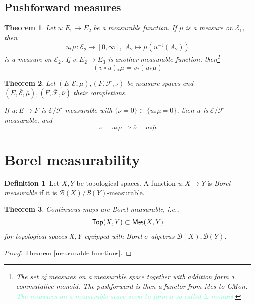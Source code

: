 \documentclass[11pt, a4paper, openany]{book}
\newtheorem{thm}{Theorem}\newtheorem{lem}{Lemma}\newtheorem{crl}{Corollary}
\theoremstyle{definition}
\newtheorem{define}{Definition}\newtheorem{exam}{Example}\newtheorem{remark}{Remark}
\newcommand{\cat}[1]{\textup{\textsf{#1}}}
\begin{document}
\subsection{Pushforward measures}
    \begin{thm}
        Let $u:E_1\rightarrow E_2$ be a measurable function. If $\mu$ is a measure on $\mathscr{E}_1$, then 
        \[
            u_*\mu:\mathscr{E}_2\rightarrow [0,\infty],\,\,A_2\mapsto \mu(u^{-1}(A_2))
        \] is a measure on $\mathscr{E}_2$. If $v:E_2\rightarrow E_3$ is another measurable function, then\footnote{The set of measures on a measurable space together with addition form a commutative monoid. The pushforward is then a functor from \cat{Mes} to \cat{CMon}. \textcolor{Aquamarine}{The measures on a measurable space seem to form a so-called $\Sigma$-monoid.}}
        \[
            (v\circ u)_*\mu=v_*(u_*\mu)
        \]
    \end{thm}
    \begin{thm}\label{pushforward of completion of measures}
        Let $(E,\mathscr{E},\mu),(F,\mathscr{F},\nu)$ be measure spaces and $(E,\overline{\mathscr{E}},\overline{\mu}), (F,\overline{\mathscr{F}},\overline{\nu})$ their completions. 
        
        If $u:E\rightarrow F$ is $\mathscr{E}/\mathscr{F}$-measurable with $\{\nu=0\}\subset \{u_*\mu=0\}$, then $u$ is $\overline{\mathscr{E}}/\overline{\mathscr{F}}$-measurable, and
        \[
            \nu=u_*\mu \Longrightarrow \overline{\nu}=u_*\overline{\mu}
        \]
    \end{thm}
\section{Borel measurability}
    \begin{define}
        Let $X,Y$ be topological spaces. A function $u:X\rightarrow Y$ is \textit{Borel measurable} if it is $\mathscr{B}(X)/\mathscr{B}(Y)$-measurable.
    \end{define}
    \begin{thm}\label{Continuous Maps are Measurable}
        Continuous maps are Borel measurable, i.e., 
        \[\cat{Top}(X,Y)\subset \cat{Mes}(X,Y)\]
        for topological spaces $X,Y$ equipped with Borel $\sigma$-algebras $\mathscr{B}(X),\mathscr{B}(Y)$.
    \end{thm}
    \begin{proof}
        Theorem \ref{measurable functions}.
    \end{proof}
\end{document}
